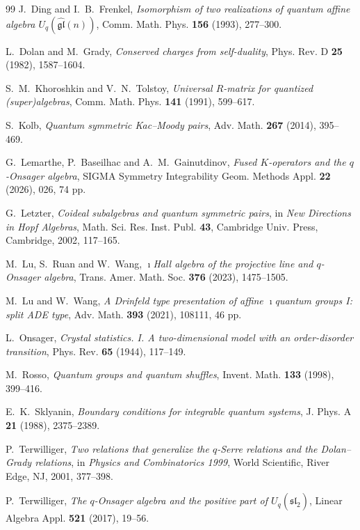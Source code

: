 \documentclass[11pt]{extarticle}
\theoremstyle{definition}
\theoremstyle{remark}
\numberwithin{equation}{section}
\begin{document}
\begin{thebibliography}{99}
J.~Ding and I.~B.~Frenkel,
\emph{Isomorphism of two realizations of quantum affine algebra
$U_q(\widehat{\mathfrak{gl}}(n))$},
Comm. Math. Phys. \textbf{156} (1993), 277--300.

L.~Dolan and M.~Grady,
\emph{Conserved charges from self-duality},
Phys. Rev. D \textbf{25} (1982), 1587--1604.

S.~M.~Khoroshkin and V.~N.~Tolstoy,
\emph{Universal $R$-matrix for quantized (super)algebras},
Comm. Math. Phys. \textbf{141} (1991), 599--617.

S.~Kolb,
\emph{Quantum symmetric Kac--Moody pairs},
Adv. Math. \textbf{267} (2014), 395--469.

G.~Lemarthe, P.~Baseilhac and A.~M.~Gainutdinov,
\emph{Fused $K$-operators and the $q$-Onsager algebra},
SIGMA Symmetry Integrability Geom. Methods Appl. \textbf{22} (2026), 026,
74 pp.

G.~Letzter,
\emph{Coideal subalgebras and quantum symmetric pairs},
in \emph{New Directions in Hopf Algebras}, Math. Sci. Res. Inst. Publ.
\textbf{43}, Cambridge Univ. Press, Cambridge, 2002, 117--165.

M.~Lu, S.~Ruan and W.~Wang,
\emph{$\imath$Hall algebra of the projective line and $q$-Onsager algebra},
Trans. Amer. Math. Soc. \textbf{376} (2023), 1475--1505.

M.~Lu and W.~Wang,
\emph{A Drinfeld type presentation of affine $\imath$quantum groups I:
split ADE type},
Adv. Math. \textbf{393} (2021), 108111, 46 pp.

L.~Onsager,
\emph{Crystal statistics. I. A two-dimensional model with an order-disorder transition},
Phys. Rev. \textbf{65} (1944), 117--149.

M.~Rosso,
\emph{Quantum groups and quantum shuffles},
Invent. Math. \textbf{133} (1998), 399--416.

E.~K.~Sklyanin,
\emph{Boundary conditions for integrable quantum systems},
J. Phys. A \textbf{21} (1988), 2375--2389.

P.~Terwilliger,
\emph{Two relations that generalize the $q$-Serre relations and the Dolan--Grady relations},
in \emph{Physics and Combinatorics 1999}, World Scientific, River Edge, NJ,
2001, 377--398.

P.~Terwilliger,
\emph{The $q$-Onsager algebra and the positive part of
$U_q(\widehat{\mathfrak{sl}}_2)$},
Linear Algebra Appl. \textbf{521} (2017), 19--56.


\end{thebibliography}
\end{document}
